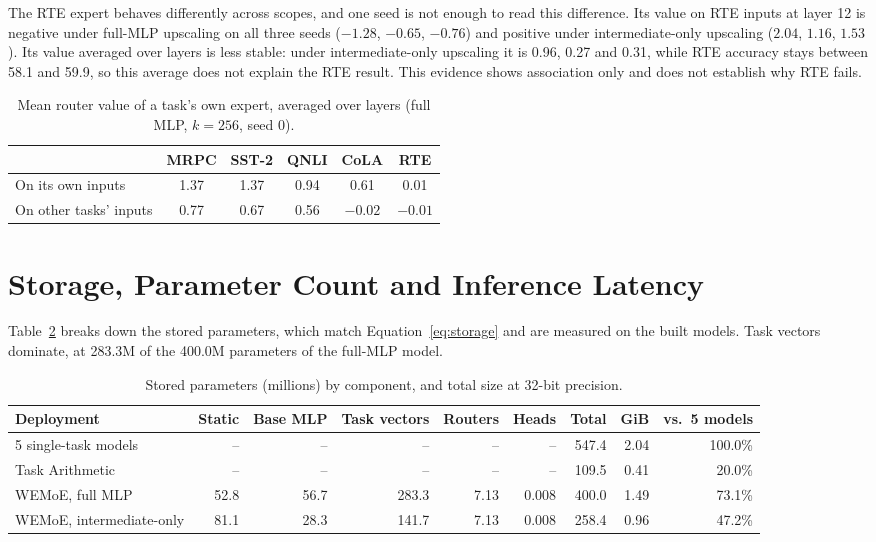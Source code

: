 The RTE expert behaves differently across scopes, and one seed is not enough to read this difference. Its value on RTE inputs at layer 12 is negative under full-MLP upscaling on all three seeds ($-1.28$, $-0.65$, $-0.76$) and positive under intermediate-only upscaling ($2.04$, $1.16$, $1.53$). Its value averaged over layers is less stable: under intermediate-only upscaling it is 0.96, 0.27 and 0.31, while RTE accuracy stays between 58.1 and 59.9, so this average does not explain the RTE result. This evidence shows association only and does not establish why RTE fails.

\begin{table}[htbp]
  \centering\tablestyle
  \caption{Mean router value of a task's own expert, averaged over layers (full MLP, $k=256$, seed 0).}
  \label{tab:own}
  \begin{tabular}{l c c c c c}
    \toprule
    & MRPC & SST-2 & QNLI & CoLA & RTE\\
    \midrule
    On its own inputs & 1.37 & 1.37 & 0.94 & 0.61 & 0.01\\
    On other tasks' inputs & 0.77 & 0.67 & 0.56 & $-0.02$ & $-0.01$\\
    \bottomrule
  \end{tabular}
\end{table}

\section{Storage, Parameter Count and Inference Latency}
\label{sec:efficiency}

Table~\ref{tab:storage} breaks down the stored parameters, which match Equation~\eqref{eq:storage} and are measured on the built models. Task vectors dominate, at 283.3M of the 400.0M parameters of the full-MLP model.

\begin{table}[htbp]
  \centering\tablestyle
  \caption{Stored parameters (millions) by component, and total size at 32-bit precision.}
  \label{tab:storage}
  \setlength{\tabcolsep}{4pt}\begin{tabular}{l r r r r r r r r}
    \toprule
    Deployment & Static & Base MLP & Task vectors & Routers & Heads & Total & GiB & vs.\ 5 models\\
    \midrule
    5 single-task models & -- & -- & -- & -- & -- & 547.4 & 2.04 & 100.0\%\\
    Task Arithmetic & -- & -- & -- & -- & -- & 109.5 & 0.41 & 20.0\%\\
    WEMoE, full MLP & 52.8 & 56.7 & 283.3 & 7.13 & 0.008 & 400.0 & 1.49 & 73.1\%\\
    WEMoE, intermediate-only & 81.1 & 28.3 & 141.7 & 7.13 & 0.008 & 258.4 & 0.96 & 47.2\%\\
    \bottomrule
  \end{tabular}
\end{table}

